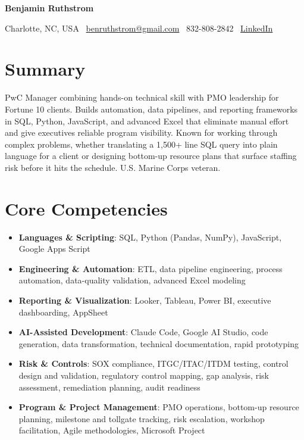 \documentclass[11pt,a4paper]{article}
\newcommand{\cvname}[1]{{\centering\fontsize{26}{28}\selectfont\bfseries #1\par}}
\newcommand{\cvcontact}[1]{{\centering\small #1\par}}
\begin{document}
\cvname{Benjamin Ruthstrom}
\vspace{2pt}
\cvcontact{Charlotte, NC, USA \textbar\ \href{mailto:benruthstrom@gmail.com}{benruthstrom@gmail.com} \textbar\ 832-808-2842 \textbar\ \href{https://linkedin.com/in/benruthstrom}{LinkedIn}}
\vspace{4pt}


\section{Summary}
PwC Manager combining hands-on technical skill with PMO leadership for Fortune 10 clients. Builds automation, data pipelines, and reporting frameworks in SQL, Python, JavaScript, and advanced Excel that eliminate manual effort and give executives reliable program visibility. Known for working through complex problems, whether translating a 1,500+ line SQL query into plain language for a client or designing bottom-up resource plans that surface staffing risk before it hits the schedule. U.S. Marine Corps veteran.


\section{Core Competencies}
\begin{itemize}
\item \textbf{Languages \& Scripting}: SQL, Python (Pandas, NumPy), JavaScript, Google Apps Script
\item \textbf{Engineering \& Automation}: ETL, data pipeline engineering, process automation, data-quality validation, advanced Excel modeling
\item \textbf{Reporting \& Visualization}: Looker, Tableau, Power BI, executive dashboarding, AppSheet
\item \textbf{AI-Assisted Development}: Claude Code, Google AI Studio, code generation, data transformation, technical documentation, rapid prototyping
\item \textbf{Risk \& Controls}: SOX compliance, ITGC/ITAC/ITDM testing, control design and validation, regulatory control mapping, gap analysis, risk assessment, remediation planning, audit readiness
\item \textbf{Program \& Project Management}: PMO operations, bottom-up resource planning, milestone and tollgate tracking, risk escalation, workshop facilitation, Agile methodologies, Microsoft Project
\end{itemize}
\end{document}
